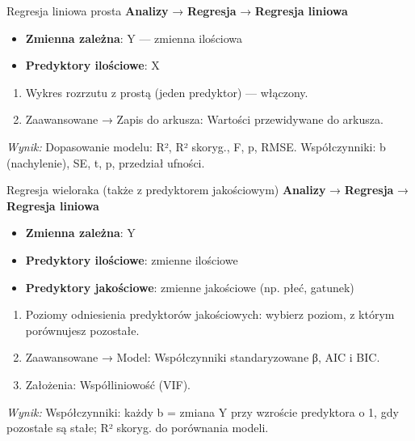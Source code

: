 \documentclass[
  polish,
  10pt,
  a4paper,
  DIV=11,
  numbers=noendperiod]{scrartcl}
\newcommand{\jmenu}[1]{{\color{upwraccent}\small #1}}
\begin{document}
\begin{jbox}{Regresja liniowa prosta}\label{w:regresja-prosta}
\jmenu{\textbf{Analizy} → \textbf{Regresja} → \textbf{Regresja liniowa}}

\begin{itemize}
\item[$\triangleright$] \textbf{Zmienna zależna}: Y — zmienna ilościowa
\item[$\triangleright$] \textbf{Predyktory ilościowe}: X
\end{itemize}
\begin{enumerate}
\item Wykres rozrzutu z prostą (jeden predyktor) — włączony.
\item Zaawansowane → Zapis do arkusza: Wartości przewidywane do arkusza.
\end{enumerate}
\textit{Wynik:} Dopasowanie modelu: R², R² skoryg., F, p, RMSE. Współczynniki: b (nachylenie), SE, t, p, przedział ufności.

\end{jbox}

\begin{jbox}{Regresja wieloraka (także z predyktorem jakościowym)}\label{w:regresja-wieloraka}
\jmenu{\textbf{Analizy} → \textbf{Regresja} → \textbf{Regresja liniowa}}

\begin{itemize}
\item[$\triangleright$] \textbf{Zmienna zależna}: Y
\item[$\triangleright$] \textbf{Predyktory ilościowe}: zmienne ilościowe
\item[$\triangleright$] \textbf{Predyktory jakościowe}: zmienne jakościowe (np. płeć, gatunek)
\end{itemize}
\begin{enumerate}
\item Poziomy odniesienia predyktorów jakościowych: wybierz poziom, z którym porównujesz pozostałe.
\item Zaawansowane → Model: Współczynniki standaryzowane β, AIC i BIC.
\item Założenia: Współliniowość (VIF).
\end{enumerate}
\textit{Wynik:} Współczynniki: każdy b = zmiana Y przy wzroście predyktora o 1, gdy pozostałe są stałe; R² skoryg. do porównania modeli.

\end{jbox}
\end{document}
